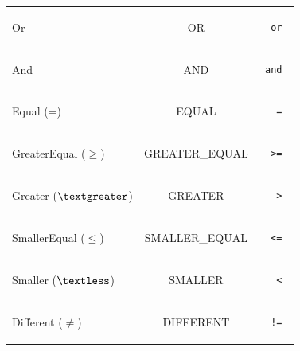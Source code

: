 \documentclass[pdftex,10pt,a4paper]{article}
\begin{document}
\begin{tabular}{|l|c|r|}
  Or & OR & \begin{minipage}{2in} \begin{verbatim} or \end{verbatim} \end{minipage} \\
  And & AND & \begin{minipage}{2in} \begin{verbatim} and \end{verbatim} \end{minipage} \\

  Equal (=) & EQUAL & \begin{minipage}{2in} \begin{verbatim} = \end{verbatim} \end{minipage} \\
  GreaterEqual ($\geq$) & GREATER\_EQUAL & \begin{minipage}{2in} \begin{verbatim} >= \end{verbatim} \end{minipage} \\
  Greater ($\textgreater$) & GREATER & \begin{minipage}{2in} \begin{verbatim} > \end{verbatim} \end{minipage} \\
  SmallerEqual ($\leq$) & SMALLER\_EQUAL & \begin{minipage}{2in} \begin{verbatim} <= \end{verbatim} \end{minipage} \\
  Smaller ($\textless$) & SMALLER & \begin{minipage}{2in} \begin{verbatim} < \end{verbatim} \end{minipage} \\
  Different ($\ne$) & DIFFERENT & \begin{minipage}{2in} \begin{verbatim} != \end{verbatim} \end{minipage} \\


\end{tabular}
\end{document}
